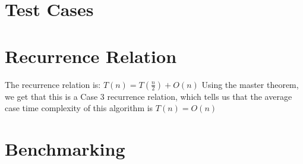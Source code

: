 \documentclass{labReport}
\begin{document}
\begin{multicols*}{2}
\section{Test Cases}

\section{Recurrence Relation}
The recurrence relation is:
$T(n) = T(\frac{n}{2})+O(n)$
Using the master theorem, we get that this is a Case 3 recurrence relation, which tells us that the average case time complexity of this algorithm is $T(n) = O(n)$

\section{Benchmarking}

\end{multicols*}

\end{document}
